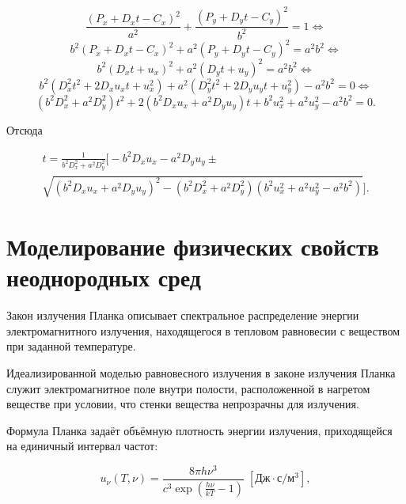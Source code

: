 \begin{equation}
	\frac{(P_x + D_x t - C_x)^2}{a^2} + \frac{(P_y + D_y t - C_y)^2}{b^2} = 1 \Leftrightarrow
\end{equation}
\begin{equation}
	b^2(P_x + D_x t - C_x)^2 + a^2(P_y + D_y t - C_y)^2 = a^2 b^2 \Leftrightarrow
\end{equation}
\begin{equation}
	b^2(D_x t + u_x)^2 + a^2(D_y t + u_y)^2 = a^2b^2 \Leftrightarrow
\end{equation}
\begin{equation}
	b^2\left(D_x^2 t^2 + 2D_x u_x t + u_x^2\right) + a^2\left(D_y^2 t^2 + 2D_y u_y t + u_y^2\right) - a^2b^2 = 0 \Leftrightarrow
\end{equation}
\begin{equation}
	\left(b^2 D_x^2 + a^2 D_y^2\right)t^2 + 2\left(b^2 D_x u_x + a^2 D_y u_y\right)t + b^2 u_x^2 + a^2 u_y^2 - a^2b^2 = 0.
\end{equation}

Отсюда

\begin{equation}
	\label{eqn:elliptic-cylinder-possible-t}
	\begin{gathered}
		t = \frac{1}{b^2 D_x^2 + a^2 D_y^2}\bigg[-b^2 D_x u_x - a^2 D_y u_y \pm \\
		\sqrt{\left(b^2 D_x u_x + a^2 D_y u_y\right)^2 - \left(b^2 D_x^2 + a^2 D_y^2\right)\left(b^2 u_x^2 + a^2 u_y^2 - a^2 b^2\right)}\bigg].
	\end{gathered}
\end{equation}

\section{Моделирование физических свойств неоднородных сред}

Закон излучения Планка описывает спектральное распределение энергии электромагнитного излучения, находящегося в тепловом равновесии с веществом при заданной температуре.

Идеализированной моделью равновесного излучения в законе излучения Планка служит электромагнитное поле внутри полости, расположенной в нагретом веществе при условии, что стенки вещества непрозрачны для излучения.

Формула Планка задаёт объёмную плотность энергии излучения, приходящейся на единичный интервал частот:

\begin{equation}
	u_\nu(T, \nu) = \frac{8\pi h\nu^3}{c^3\exp{\left(\frac{h\nu}{kT} - 1\right)}} \; \left[\text{Дж}\cdot\text{с}/\text{м}^3\right],
\end{equation}

